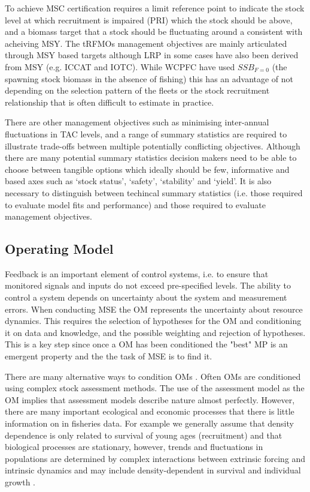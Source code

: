 \documentclass[%
nonumbib,      %
%
]{nrc1}                          %
\begin{document}
To achieve MSC certification requires a limit reference point to indicate the stock level at which recruitment is impaired (PRI) which the stock should be above, and a biomass target that a stock should be fluctuating around a consistent with acheiving MSY. The tRFMOs management objectives are mainly articulated through MSY based targets \citep{kell2016quantification} although LRP in some cases have also been derived from MSY (e.g. ICCAT and IOTC). While WCPFC have used $SSB_{F=0}$ (the spawning stock biomass in the absence of fishing) this has an advantage of not depending on the selection pattern of the fleets or the stock recruitment relationship that is often difficult to estimate in practice. 

There are other management objectives such as minimising inter-annual fluctuations in TAC levels, and a range of summary statistics are required to illustrate trade-offs between multiple potentially conflicting objectives. Although there are many potential summary statistics decision makers need to be able to choose between tangible options which ideally should be few, informative and based axes such as ‘stock status’, `safety', `stability' and `yield'. It is also necessary to distinguish between techincal summary statistics (i.e. those required to evaluate model fits and performance) and those required to evaluate management objectives.


\newpage
\subsection{Operating Model}

Feedback is an important element of control systems, i.e. to ensure that monitored signals and inputs do not exceed pre-specified levels. The ability to control a system depends on uncertainty about the system and measurement errors. When conducting MSE the OM represents the uncertainty about resource dynamics. This requires the selection of hypotheses for the OM and conditioning it on data and knowledge, and the possible weighting and rejection of hypotheses. This is a key step since once a OM has been conditioned the "best" MP is an emergent property and the the task of MSE is to find it. 

There are many alternative ways to condition OMs \citep{kell2006operational}.  Often OMs are conditioned using complex stock assessment methods. The use of the assessment model as the OM implies that assessment models describe nature almost perfectly. However, there are many important ecological and economic processes that there is little information on in fisheries data. For example we generally assume that density dependence is only related to survival of young ages (recruitment) and that biological processes are stationary, however, trends and fluctuations in populations are determined by complex interactions between extrinsic forcing and intrinsic dynamics and may include density-dependent in survival and individual growth \citep{bjoernstad2004trends}. 
\end{document}
